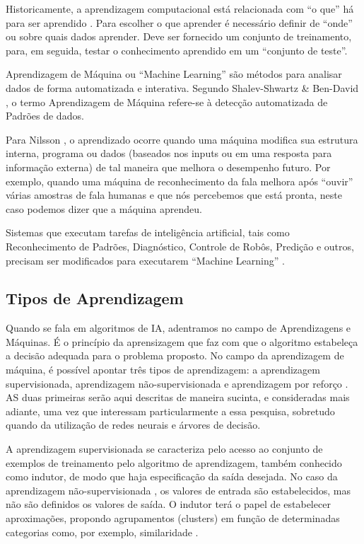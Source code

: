 Historicamente, a aprendizagem computacional está relacionada com ``o que'' há para ser aprendido \cite{Nilsson2005}. 
Para escolher o que aprender é necessário definir de ``onde'' ou sobre quais dados aprender.
Deve ser fornecido um conjunto de treinamento, para, em seguida, testar o conhecimento aprendido em um ``conjunto de teste''.

Aprendizagem de Máquina ou ``Machine Learning'' são métodos para analisar dados de forma automatizada e interativa.
Segundo Shalev-Shwartz \& Ben-David \cite{Ben-David2014}, o termo Aprendizagem de Máquina refere-se à detecção automatizada de Padrões de dados.

Para Nilsson \cite{Nilsson2005}, o aprendizado ocorre quando uma máquina modifica sua estrutura interna, programa ou dados 
(baseados nos inputs ou em uma resposta para informação externa) de tal maneira que melhora o desempenho futuro. Por exemplo, quando uma máquina de reconhecimento da fala melhora após ``ouvir'' várias amostras de fala humanas e que nós percebemos que está pronta, neste caso podemos dizer que a máquina aprendeu.

Sistemas que executam tarefas de inteligência artificial, tais como Reconhecimento de Padrões, Diagnóstico, Controle de Robôs, Predição e outros, precisam ser modificados para executarem ``Machine Learning'' \cite{Nilsson2005}.


\subsection{Tipos de Aprendizagem}

Quando se fala em algoritmos de IA, adentramos no campo de Aprendizagens e Máquinas. É o princípio da aprensizagem que faz com que o algoritmo estabeleça a decisão adequada para o problema proposto.
No campo da aprendizagem de máquina, é possível apontar três tipos de aprendizagem: a aprendizagem supervisionada, aprendizagem não-supervisionada e aprendizagem por reforço \cite{NorvigRussel2004}. AS duas primeiras serão aqui descritas de maneira sucinta, e consideradas mais adiante, uma vez que interessam particularmente a essa pesquisa, sobretudo quando da utilização de redes neurais e árvores de decisão. 

A aprendizagem supervisionada \cite{Monard} se caracteriza pelo acesso ao conjunto de exemplos de treinamento pelo algoritmo de aprendizagem, também conhecido como indutor, de modo que haja especificação da saída desejada.
No caso da aprendizagem não-supervisionada \cite{NorvigRussel2004}, os valores de entrada são estabelecidos, mas não são definidos os valores de saída. O indutor terá o papel de estabelecer aproximações, propondo agrupamentos (clusters) em função de determinadas categorias como, por exemplo, similaridade \cite{Monard}.

